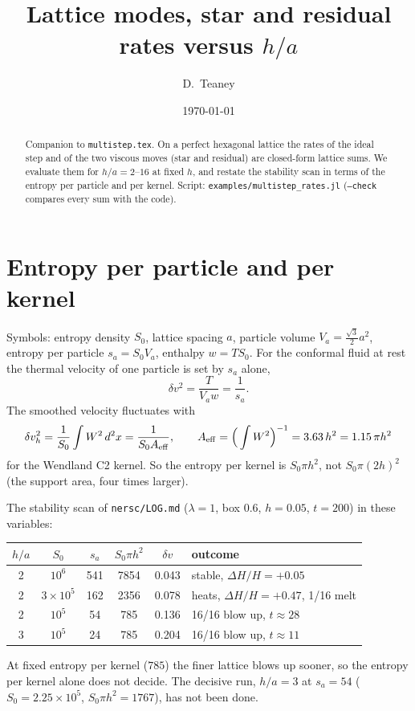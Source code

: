 \documentclass[11pt,aps,preprint,nofootinbib,superscriptaddress,tightenlines]{revtex4-2}
\def\st{\begin{equation}}
\def\stp{\end{equation}}
\begin{document}
\title{Lattice modes, star and residual rates versus $h/a$}
\author{D.~Teaney}
\date{\today}

\begin{abstract}
Companion to \texttt{multistep.tex}.  On a perfect hexagonal lattice the rates of
the ideal step and of the two viscous moves (star and residual) are closed-form
lattice sums.  We evaluate them for $h/a=2$--$16$ at fixed $h$, and restate the
stability scan in terms of the entropy per particle and per kernel.  Script:
\texttt{examples/multistep\_rates.jl} (\texttt{--check} compares every sum with the
code).
\end{abstract}

\maketitle

\section{Entropy per particle and per kernel}

Symbols: entropy density $S_0$, lattice spacing $a$, particle volume
$V_a=\tfrac{\sqrt3}{2}a^2$, entropy per particle $s_a=S_0V_a$, enthalpy $w=TS_0$.
For the conformal fluid at rest the thermal velocity of one particle is set by
$s_a$ alone,
\st
\delta v^2=\frac{T}{V_aw}=\frac1{s_a} .
\stp
The smoothed velocity fluctuates with
\st
\delta v_h^2=\frac{1}{S_0}\int W^2\,d^2x=\frac{1}{S_0A_{\rm eff}},\qquad
A_{\rm eff}=\Big(\int W^2\Big)^{-1}=3.63\,h^2=1.15\,\pi h^2
\stp
for the Wendland C2 kernel.  So the entropy per kernel is $S_0\pi h^2$, not
$S_0\pi(2h)^2$ (the support area, four times larger).

The stability scan of \texttt{nersc/LOG.md} ($\lambda=1$, box $0.6$, $h=0.05$, $t=200$) in
these variables:
\begin{center}
\begin{tabular}{cccccl}
$h/a$ & $S_0$ & $s_a$ & $S_0\pi h^2$ & $\delta v$ & outcome \\ \hline
2 & $10^6$           & 541 & 7854 & 0.043 & stable, $\Delta H/H=+0.05$ \\
2 & $3\times10^5$    & 162 & 2356 & 0.078 & heats, $\Delta H/H=+0.47$, 1/16 melt \\
2 & $10^5$           & 54  & 785  & 0.136 & 16/16 blow up, $t\approx28$ \\
3 & $10^5$           & 24  & 785  & 0.204 & 16/16 blow up, $t\approx11$
\end{tabular}
\end{center}
At fixed entropy per kernel ($785$) the finer lattice blows up sooner, so the
entropy per kernel alone does not decide.  The decisive run, $h/a=3$ at $s_a=54$
($S_0=2.25\times10^5$, $S_0\pi h^2=1767$), has not been done.
\end{document}
